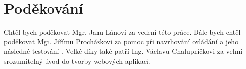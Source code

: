 \clearpageenabledfalse %
\newpage
\mbox{}
\vfill
\section*{Poděkování}
Chtěl bych poděkovat Mgr. Janu Lánovi za vedení této práce.
Dále bych chtěl poděkovat Mgr. Jiřímu Procházkovi za pomoc při navrhování ovládání a jeho následné testování . Velké díky také patří Ing. Václavu Chalupníčkovi za velmi srozumitelný úvod do tvorby webových aplikací.

\clearpageenabledtrue
